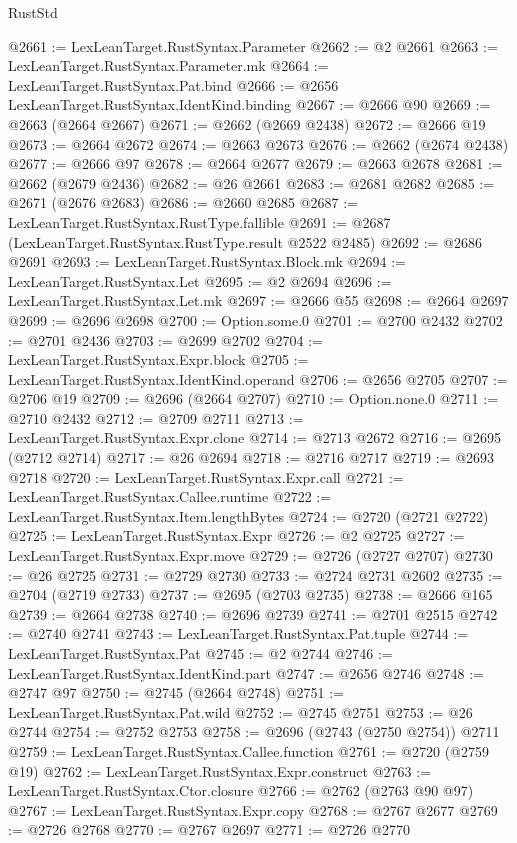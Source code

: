 \begin{lexlean}{RustStd}
\begin{coremodule}
@2661 := LexLeanTarget.RustSyntax.Parameter
@2662 := @2 @2661
@2663 := LexLeanTarget.RustSyntax.Parameter.mk
@2664 := LexLeanTarget.RustSyntax.Pat.bind
@2666 := @2656 LexLeanTarget.RustSyntax.IdentKind.binding
@2667 := @2666 @90
@2669 := @2663 (@2664 @2667)
@2671 := @2662 (@2669 @2438)
@2672 := @2666 @19
@2673 := @2664 @2672
@2674 := @2663 @2673
@2676 := @2662 (@2674 @2438)
@2677 := @2666 @97
@2678 := @2664 @2677
@2679 := @2663 @2678
@2681 := @2662 (@2679 @2436)
@2682 := @26 @2661
@2683 := @2681 @2682
@2685 := @2671 (@2676 @2683)
@2686 := @2660 @2685
@2687 := LexLeanTarget.RustSyntax.RustType.fallible
@2691 := @2687 (LexLeanTarget.RustSyntax.RustType.result @2522 @2485)
@2692 := @2686 @2691
@2693 := LexLeanTarget.RustSyntax.Block.mk
@2694 := LexLeanTarget.RustSyntax.Let
@2695 := @2 @2694
@2696 := LexLeanTarget.RustSyntax.Let.mk
@2697 := @2666 @55
@2698 := @2664 @2697
@2699 := @2696 @2698
@2700 := Option.some.{0}
@2701 := @2700 @2432
@2702 := @2701 @2436
@2703 := @2699 @2702
@2704 := LexLeanTarget.RustSyntax.Expr.block
@2705 := LexLeanTarget.RustSyntax.IdentKind.operand
@2706 := @2656 @2705
@2707 := @2706 @19
@2709 := @2696 (@2664 @2707)
@2710 := Option.none.{0}
@2711 := @2710 @2432
@2712 := @2709 @2711
@2713 := LexLeanTarget.RustSyntax.Expr.clone
@2714 := @2713 @2672
@2716 := @2695 (@2712 @2714)
@2717 := @26 @2694
@2718 := @2716 @2717
@2719 := @2693 @2718
@2720 := LexLeanTarget.RustSyntax.Expr.call
@2721 := LexLeanTarget.RustSyntax.Callee.runtime
@2722 := LexLeanTarget.RustSyntax.Item.lengthBytes
@2724 := @2720 (@2721 @2722)
@2725 := LexLeanTarget.RustSyntax.Expr
@2726 := @2 @2725
@2727 := LexLeanTarget.RustSyntax.Expr.move
@2729 := @2726 (@2727 @2707)
@2730 := @26 @2725
@2731 := @2729 @2730
@2733 := @2724 @2731 @2602
@2735 := @2704 (@2719 @2733)
@2737 := @2695 (@2703 @2735)
@2738 := @2666 @165
@2739 := @2664 @2738
@2740 := @2696 @2739
@2741 := @2701 @2515
@2742 := @2740 @2741
@2743 := LexLeanTarget.RustSyntax.Pat.tuple
@2744 := LexLeanTarget.RustSyntax.Pat
@2745 := @2 @2744
@2746 := LexLeanTarget.RustSyntax.IdentKind.part
@2747 := @2656 @2746
@2748 := @2747 @97
@2750 := @2745 (@2664 @2748)
@2751 := LexLeanTarget.RustSyntax.Pat.wild
@2752 := @2745 @2751
@2753 := @26 @2744
@2754 := @2752 @2753
@2758 := @2696 (@2743 (@2750 @2754)) @2711
@2759 := LexLeanTarget.RustSyntax.Callee.function
@2761 := @2720 (@2759 @19)
@2762 := LexLeanTarget.RustSyntax.Expr.construct
@2763 := LexLeanTarget.RustSyntax.Ctor.closure
@2766 := @2762 (@2763 @90 @97)
@2767 := LexLeanTarget.RustSyntax.Expr.copy
@2768 := @2767 @2677
@2769 := @2726 @2768
@2770 := @2767 @2697
@2771 := @2726 @2770

\end{coremodule}
\end{lexlean}
